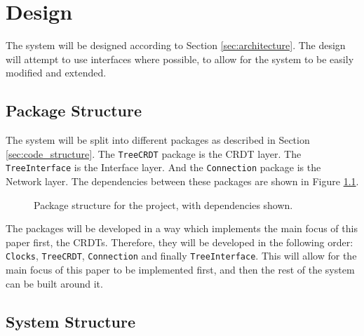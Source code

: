 \documentclass[12pt]{report}
\begin{document}
\newpage
\chapter{Design}
The system will be designed according to Section \ref{sec:architecture}. The design will attempt to use interfaces where possible, to allow for the system to be easily modified and extended. 

\section{Package Structure}
The system will be split into different packages as described in Section \ref{sec:code_structure}. The \texttt{TreeCRDT} package is the CRDT layer. The \texttt{TreeInterface} is the Interface layer. And the \texttt{Connection} package is the Network layer. The dependencies between these packages are shown in Figure \ref{fig:packages}.

\begin{figure}[H] 
    \centering
    \caption{Package structure for the project, with dependencies shown.}
    \label{fig:packages}
\end{figure}

The packages will be developed in a way which implements the main focus of this paper first, the CRDTs. Therefore, they will be developed in the following order: \texttt{Clocks}, \texttt{TreeCRDT}, \texttt{Connection} and finally \texttt{TreeInterface}. This will allow for the main focus of this paper to be implemented first, and then the rest of the system can be built around it. \par

\section{System Structure}
\end{document}
